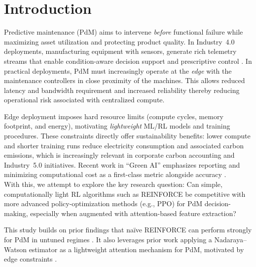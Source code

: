 \documentclass[sn-basic]{sn-jnl} %
\begin{document}

\maketitle

\section{Introduction}
Predictive maintenance (PdM) aims to intervene \emph{before} functional failure while maximizing asset utilization and protecting product quality. In Industry~4.0 deployments, manufacturing equipment with sensors, generate rich telemetry streams that enable condition-aware decision support and prescriptive control \cite{Zonta2020, Compare2020}. In practical deployments, PdM must increasingly operate at the \emph{edge} with the maintenance controllers in close proximity of the machines. This allows reduced latency and bandwidth requirement and increased reliability thereby reducing operational risk associated with centralized compute.

Edge deployment imposes hard resource limits (compute cycles, memory footprint, and energy), motivating \emph{lightweight} ML/RL models and training procedures. These constraints directly offer sustainability benefits: lower compute and shorter training runs reduce electricity consumption and associated carbon emissions, which is increasingly relevant in corporate carbon accounting and Industry~5.0 initiatives. Recent work in ``Green AI'' emphasizes reporting and minimizing computational cost as a first-class metric alongside accuracy \cite{Schwartz2020, Strubell2019}.\\

With this, we attempt to explore the key research question: Can simple, computationally light RL algorithms such as \textsc{REINFORCE} be competitive with more advanced policy-optimization methods (e.g., \textsc{PPO}) for PdM decision-making, especially when augmented with attention-based feature extraction?

This study builds on prior findings that na\"{i}ve \textsc{REINFORCE} can perform strongly for PdM in untuned regimes \cite{Siraskar2025}. It also leverages prior work applying a Nadaraya--Watson estimator as a lightweight attention mechanism for PdM, motivated by edge constraints \cite{Siraskar2024}.
\end{document}
